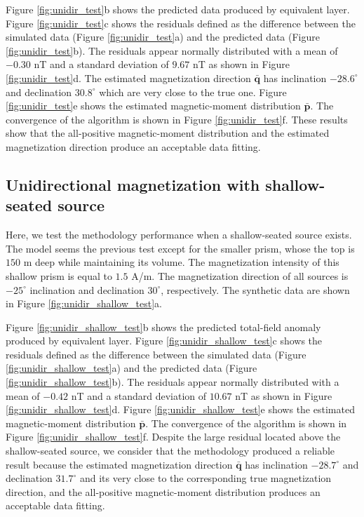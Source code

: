 Figure \ref{fig:unidir_test}b shows the predicted data produced by equivalent layer. 
Figure \ref{fig:unidir_test}c shows the residuals defined as the difference between the simulated data (Figure \ref{fig:unidir_test}a) and the predicted data (Figure \ref{fig:unidir_test}b). The residuals appear normally distributed with a mean of $-0.30$ nT and a standard deviation of $9.67$  nT as shown in Figure \ref{fig:unidir_test}d. The estimated magnetization direction $\bar{\mathbf{q}}$ has inclination $-28.6^\circ$ and declination $30.8^\circ$ which are very close to the true one. Figure \ref{fig:unidir_test}e shows the estimated magnetic-moment distribution $\bar{\mathbf{p}}$. The convergence of the algorithm is shown in Figure \ref{fig:unidir_test}f. These results show that the all-positive magnetic-moment distribution and the estimated magnetization direction produce an acceptable data fitting.

\subsection{Unidirectional magnetization with shallow-seated source}

Here, we test the methodology performance when a shallow-seated source exists. The model seems the previous test except for the smaller prism, whose the top is $150$ m deep while maintaining its volume. The magnetization intensity of this shallow prism is equal to $1.5$ A/m. The magnetization direction of all sources is $-25^\circ$ inclination and declination $30^\circ$, respectively. The synthetic data are shown in Figure \ref{fig:unidir_shallow_test}a.

Figure \ref{fig:unidir_shallow_test}b shows the predicted total-field anomaly produced by equivalent layer. Figure \ref{fig:unidir_shallow_test}c shows the residuals defined as the difference between the simulated data (Figure \ref{fig:unidir_shallow_test}a) and the predicted data (Figure \ref{fig:unidir_shallow_test}b). The residuals appear normally distributed with a mean of $-0.42$ nT and a standard deviation of $10.67$ nT as shown in Figure \ref{fig:unidir_shallow_test}d. Figure \ref{fig:unidir_shallow_test}e shows the estimated magnetic-moment distribution $\bar{\mathbf{p}}$. The convergence of the algorithm is shown in Figure \ref{fig:unidir_shallow_test}f. Despite the large residual located above the shallow-seated source, we consider that the methodology produced a reliable result because the estimated magnetization direction $\bar{\mathbf{q}}$ has inclination $-28.7^\circ$ and declination $31.7^\circ$ and its very close to the corresponding true magnetization direction, and the all-positive magnetic-moment distribution produces an acceptable data fitting. 

